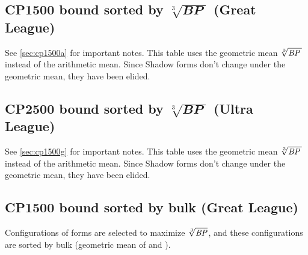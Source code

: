 \subsection[CP1500 bound sorted by \protect{$\sqrt[3]{\BP\,}$} (Great League)]%
{CP1500 bound sorted by $\sqrt[3]{\mathbfit{BP}\;}$ (Great League)\label{sec:cp1500g}}
See \autoref{sec:cp1500a} for important notes.
This table uses the geometric mean $\sqrt[3]{\BP\,}$ instead of the arithmetic mean.
Since Shadow forms don't change under the geometric mean, they have been elided.

\subsection[CP2500 bound sorted by \protect{$\sqrt[3]{\BP\,}$} (Ultra League)]%
{CP2500 bound sorted by $\sqrt[3]{\mathbfit{BP}\;}$ (Ultra League)\label{sec:cp2500g}}
See \autoref{sec:cp1500g} for important notes.
This table uses the geometric mean $\sqrt[3]{\mbox{$\mathit{BP}$}{}\,}$ instead of the arithmetic mean.
Since Shadow forms don't change under the geometric mean, they have been elided.

\subsection[CP1500 bounded sorted by bulk (Great League)]
{CP1500 bound sorted by bulk (Great League)\label{subsec:cp1500b}}
Configurations of forms are selected to maximize $\sqrt[3]{\mbox{$\mathit{BP}$}}$, and these
 configurations are sorted by bulk (geometric mean of \MHP and ).

